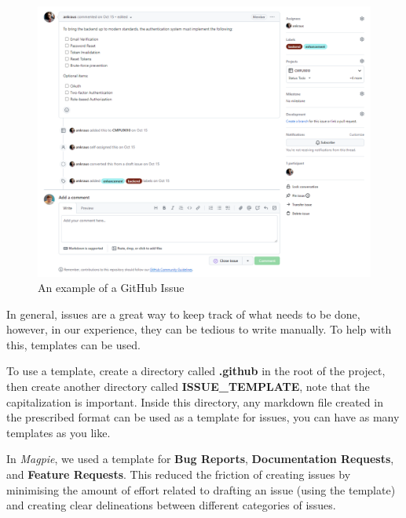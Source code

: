 \documentclass[preview]{standalone}
\begin{document}
\begin{figure}[htbp]
    \centering{}
    \includegraphics[width=\textwidth]{images/github_issue.png}
    \caption{An example of a GitHub Issue}
\end{figure}

\newpage{}

In general, issues are a great way to keep track of what needs to be done,
however, in our experience, they can be tedious to write manually. To help with
this, templates can be used.

To use a template, create a directory called \textbf{.github} in the root of the
project, then create another directory called \textbf{ISSUE\_TEMPLATE}, note
that the capitalization is important. Inside this directory, any markdown file
created in the prescribed format can be used as a template for issues, you can
have as many templates as you like.

In \textit{Magpie}, we used a template for \textbf{Bug Reports},
\textbf{Documentation Requests}, and \textbf{Feature Requests}. This reduced the
friction of creating issues by minimising the amount of effort related to
drafting an issue (using the template) and creating clear delineations between
different categories of issues.
\end{document}
